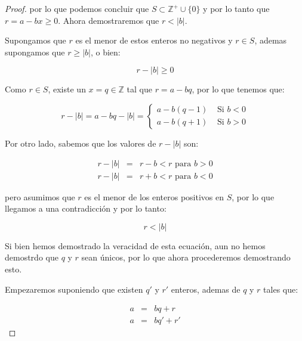 \begin{proof}
            por lo que podemos concluir que $S \subset \mathbb{Z}^+ \cup \{0\}$ y por lo tanto que $r = a - bx \geq 0$.
            Ahora demostraremos que $r < |b|$.

            Supongamos que $r$ es el menor de estos enteros no negativos y $r \in S$, ademas supongamos que $r \geq |b|$, o bien:

            \begin{equation*}
                r - |b| \geq 0
            \end{equation*}

            Como $r \in S$, existe un $x = q \in \mathbb{Z}$ tal que $r = a - bq$, por lo que tenemos que:

            \begin{equation*}
                r - |b| = a - bq - |b| =
                \begin{cases}
                    a - b (q - 1) & \text{ Si } b < 0 \\
                    a - b (q + 1) & \text{ Si } b > 0 
                \end{cases}
            \end{equation*}

            Por otro lado, sabemos que los valores de $r - |b|$ son:

            \begin{eqnarray*}
                r - |b| & = & r - b < r \text{ para } b > 0 \\
                r - |b| & = & r + b < r \text{ para } b < 0
            \end{eqnarray*}

            pero asumimos que $r$ es el menor de los enteros positivos en $S$, por lo que llegamos a una contradicción y por lo tanto:

            \begin{equation*}
                r < |b|
            \end{equation*}

            Si bien hemos demostrado la veracidad de esta ecuación, aun no hemos demostrdo que $q$ y $r$ sean únicos, por lo que ahora procederemos demostrando esto.

            Empezaremos suponiendo que existen $q'$ y $r'$ enteros, ademas de $q$ y $r$ tales que:

            \begin{eqnarray*}
                a & = & bq + r \\
                a & = & bq' + r'
            \end{eqnarray*}


\end{proof}
